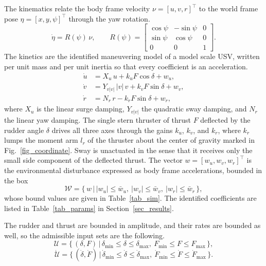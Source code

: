 \documentclass[5p,times,authoryear]{elsarticle}
\begin{document}
The kinematics relate the body frame velocity $\nu = [u, v, r]^\top$ to the world frame pose $\eta = [x, y, \psi]^\top$ through the yaw rotation.
\begin{equation}\label{eq_kin}
\dot\eta = R(\psi)\,\nu,\qquad
R(\psi) = \begin{bmatrix} \cos\psi & -\sin\psi & 0 \\ \sin\psi & \cos\psi & 0 \\ 0 & 0 & 1 \end{bmatrix}.
\end{equation}
The kinetics are the identified maneuvering model of a model scale USV, written per unit mass and per unit inertia so that every coefficient is an acceleration.
\begin{equation}\label{eq_kinetics}
\begin{aligned}
\dot u &= X_u\,u + k_u F\cos\delta + w_u, \\
\dot v &= Y_{v|v|}\,|v|\,v + k_v F\sin\delta + w_v, \\
\dot r &= N_r\,r - k_r F\sin\delta + w_r,
\end{aligned}
\end{equation}
where $X_u$ is the linear surge damping, $Y_{v|v|}$ the quadratic sway damping, and $N_r$ the linear yaw damping. The single stern thruster of thrust $F$ deflected by the rudder angle $\delta$ drives all three axes through the gains $k_u$, $k_v$, and $k_r$, where $k_r$ lumps the moment arm $l_r$ of the thruster about the center of gravity marked in Fig.~\ref{fig_coordinate}. Sway is unactuated in the sense that it receives only the small side component of the deflected thrust. The vector $w = [w_u, w_v, w_r]^\top$ is the environmental disturbance expressed as body frame accelerations, bounded in the box
\begin{equation}\label{eq_wbox}
\mathcal{W} = \big\{\, w \,\big|\, |w_u|\le \bar w_u,\ |w_v|\le \bar w_v,\ |w_r|\le \bar w_r \,\big\},
\end{equation}
whose bound values are given in Table~\ref{tab_sim}. The identified coefficients are listed in Table~\ref{tab_params} in Section~\ref{sec_results}.

The rudder and thrust are bounded in amplitude, and their rates are bounded as well, so the admissible input sets are the following.
\begin{equation}\label{eq_amp}
\mathcal{U} = \big\{\, (\delta, F) \,\big|\, \delta_{\min}\le \delta\le \delta_{\max},\ F_{\min}\le F\le F_{\max} \,\big\},
\end{equation}
\begin{equation}\label{eq_rate}
\dot{\mathcal{U}} = \big\{\, (\dot\delta, \dot F) \,\big|\, \dot\delta_{\min}\le \dot\delta\le \dot\delta_{\max},\ \dot F_{\min}\le \dot F\le \dot F_{\max} \,\big\}.
\end{equation}
\end{document}
